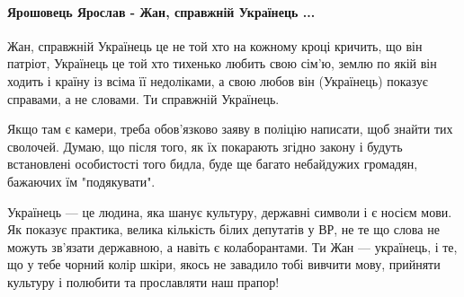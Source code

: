  
 
 
 
 
\paragraph{Ярошовець Ярослав - Жан, справжній Українець ...}

\begin{itemize}
 

Жан, справжній Українець це не той хто на кожному кроці кричить, що він
патріот, Українець це той хто тихенько любить свою сім'ю, землю по якій він
ходить і країну із всіма її недоліками, а свою любов він (Українець) показує
справами, а не словами. Ти справжній Українець.


 

Якщо там є камери, треба обов'язково заяву в поліцію написати, щоб знайти тих
сволочей. Думаю, що після того, як їх покарають згідно закону і будуть
встановлені особистості того бидла, буде ще багато небайдужих громадян,
бажаючих їм "подякувати".


 

Українець — це людина, яка шанує культуру, державні символи і є носієм мови. Як
показує практика, велика кількість білих депутатів у ВР, не те що слова не
можуть зв’язати державною, а навіть є колаборантами. Ти Жан — українець, і те,
що у тебе чорний колір шкіри, якось не завадило тобі вивчити мову, прийняти
культуру і полюбити та прославляти наш прапор!


\end{itemize}

